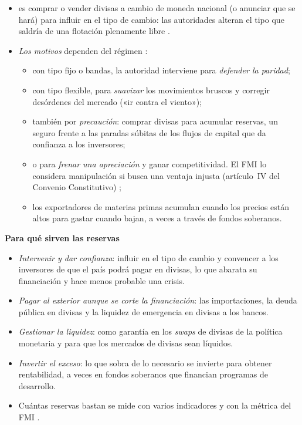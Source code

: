 \documentclass[11pt]{article}
\begin{document}
\begin{itemize}
\item {} es comprar o vender divisas a cambio de moneda nacional (o anunciar que se hará) para influir en el tipo de cambio: las autoridades alteran el tipo que saldría de una flotación plenamente libre .
\item \emph{Los motivos} dependen del régimen  :
  \begin{itemize}
  \item con tipo fijo o bandas, la autoridad interviene para \emph{defender la paridad};
  \item con tipo flexible, para \emph{suavizar} los movimientos bruscos y corregir desórdenes del mercado («ir contra el viento»);
  \item también por \emph{precaución}: comprar divisas para acumular reservas, un seguro frente a las paradas súbitas de los flujos de capital que da confianza a los inversores;
  \item o para \emph{frenar una apreciación} y ganar competitividad. El FMI lo considera manipulación si busca una ventaja injusta (artículo~IV del Convenio Constitutivo) ;
  \item los exportadores de materias primas acumulan cuando los precios están altos para gastar cuando bajan, a veces a través de fondos soberanos.
  \end{itemize}
\end{itemize}

\begin{anotaciones}
\textbf{Para qué sirven las reservas}
\begin{itemize}
\item \emph{Intervenir y dar confianza}: influir en el tipo de cambio y convencer a los inversores de que el país podrá pagar en divisas, lo que abarata su financiación y hace menos probable una crisis.
\item \emph{Pagar al exterior aunque se corte la financiación}: las importaciones, la deuda pública en divisas y la liquidez de emergencia en divisas a los bancos.
\item \emph{Gestionar la liquidez}: como garantía en los \emph{swaps} de divisas de la política monetaria y para que los mercados de divisas sean líquidos.
\item \emph{Invertir el exceso}: lo que sobra de lo necesario se invierte para obtener rentabilidad, a veces en fondos soberanos que financian programas de desarrollo.
\item Cuántas reservas bastan se mide con varios indicadores y con la métrica del FMI .
\end{itemize}
\end{anotaciones}
\end{document}
